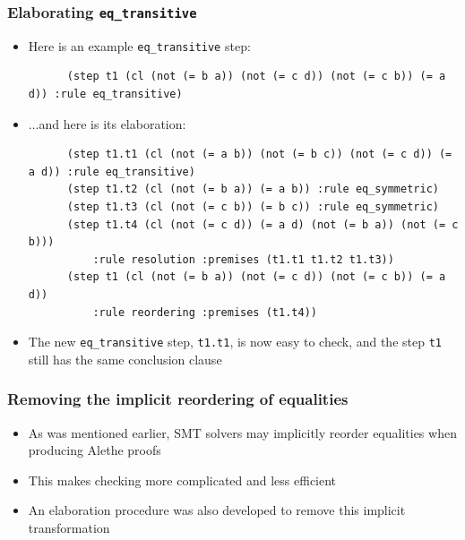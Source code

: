 \documentclass[usepdftitle=false,aspectratio=169]{beamer}
\newcommand\vitem{\vfill\item}
\begin{document}
\begin{frame}[fragile]
  \frametitle{Elaborating \texttt{eq\_transitive}}
  \begin{itemize}
    \item Here is an example \texttt{eq\_transitive} step:
    \begin{verbatim}
      (step t1 (cl (not (= b a)) (not (= c d)) (not (= c b)) (= a d)) :rule eq_transitive)
    \end{verbatim}
    \vitem ...and here is its elaboration:
    \begin{verbatim}
      (step t1.t1 (cl (not (= a b)) (not (= b c)) (not (= c d)) (= a d)) :rule eq_transitive)
      (step t1.t2 (cl (not (= b a)) (= a b)) :rule eq_symmetric)
      (step t1.t3 (cl (not (= c b)) (= b c)) :rule eq_symmetric)
      (step t1.t4 (cl (not (= c d)) (= a d) (not (= b a)) (not (= c b)))
          :rule resolution :premises (t1.t1 t1.t2 t1.t3))
      (step t1 (cl (not (= b a)) (not (= c d)) (not (= c b)) (= a d))
          :rule reordering :premises (t1.t4))
    \end{verbatim}
    \vitem The new \texttt{eq\_transitive} step, \texttt{t1.t1}, is now easy to
    check, and the step \texttt{t1} still has the same conclusion clause
  \end{itemize}
\end{frame}

\begin{frame}
  \frametitle{Removing the implicit reordering of equalities}
  \begin{itemize}
    \item As was mentioned earlier, SMT solvers may implicitly reorder
    equalities when producing Alethe proofs
    \vitem This makes checking more complicated and less efficient
    \vitem An elaboration procedure was also developed to remove this implicit
    transformation
  \end{itemize}
\end{frame}
\end{document}
